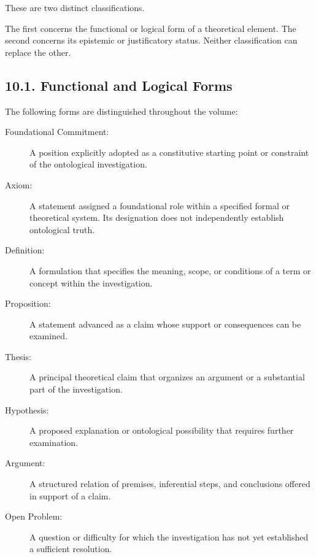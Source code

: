 These are two distinct classifications.

The first concerns the functional or
logical form of a theoretical element.
The second concerns its epistemic or
justificatory status. Neither classification
can replace the other.

\subsection*{10.1. Functional and Logical Forms}

The following forms are distinguished
throughout the volume:

\begin{description}

    \item[Foundational Commitment:]
    A position explicitly adopted as
    a constitutive starting point or
    constraint of the ontological
    investigation.

    \item[Axiom:]
    A statement assigned a foundational
    role within a specified formal or
    theoretical system. Its designation
    does not independently establish
    ontological truth.

    \item[Definition:]
    A formulation that specifies the
    meaning, scope, or conditions of
    a term or concept within the
    investigation.

    \item[Proposition:]
    A statement advanced as a claim
    whose support or consequences
    can be examined.

    \item[Thesis:]
    A principal theoretical claim
    that organizes an argument or
    a substantial part of the
    investigation.

    \item[Hypothesis:]
    A proposed explanation or
    ontological possibility that
    requires further examination.

    \item[Argument:]
    A structured relation of premises,
    inferential steps, and conclusions
    offered in support of a claim.

    \item[Open Problem:]
    A question or difficulty for which
    the investigation has not yet
    established a sufficient resolution.

\end{description}

